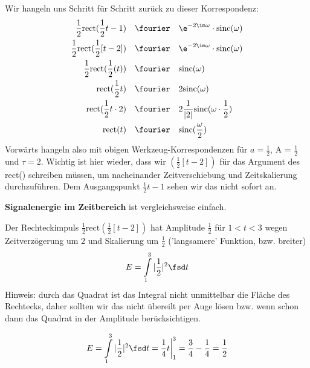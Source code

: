 \begin{ExCalc}
Wir hangeln uns Schritt für Schritt zurück zu dieser Korrespondenz:
\begin{align}
\frac{1}{2} \mathrm{rect}(\frac{1}{2}t - 1) &\quad\fourier\quad \e^{-2 \im \omega} \cdot \mathrm{sinc}(\omega)\\
\frac{1}{2} \mathrm{rect}(\frac{1}{2} [t - 2]) &\quad\fourier\quad \e^{-2 \im \omega} \cdot \mathrm{sinc}(\omega)\\
\frac{1}{2} \mathrm{rect}(\frac{1}{2} (t)) &\quad\fourier\quad \mathrm{sinc}(\omega)\\
\mathrm{rect}(\frac{1}{2} t) &\quad\fourier\quad 2 \mathrm{sinc}(\omega)\\
\mathrm{rect}(\frac{1}{2} t \cdot 2) &\quad\fourier\quad 2 \frac{1}{|2|} \mathrm{sinc}(\omega \cdot \frac{1}{2})\\
\mathrm{rect}(t) &\quad\fourier\quad \mathrm{sinc}(\frac{\omega}{2})
\end{align}
Vorwärts hangeln also mit obigen Werkzeug-Korrespondenzen für $a=\frac{1}{2}$, A = $\frac{1}{2}$ und $\tau=2$.
Wichtig ist hier wieder, dass wir $(\frac{1}{2} [t - 2])$ für das Argument des rect()
schreiben müssen, um nacheinander
Zeitverschiebung und Zeitskalierung durchzuführen. Dem Ausgangspunkt $\frac{1}{2}t - 1$
sehen wir das nicht sofort an.
\end{ExCalc}

\begin{Ansatz}
\textbf{Signalenergie im Zeitbereich} ist vergleichsweise einfach.

Der Rechteckimpuls $\frac{1}{2} \mathrm{rect}(\frac{1}{2} [t - 2])$ hat Amplitude
$\frac{1}{2}$ für $1 < t < 3$ wegen Zeitverzögerung um $2$ und Skalierung um $\frac{1}{2}$
('langsamere' Funktion, bzw. breiter)
%
\begin{equation}
  E = \int\limits_{1}^{3} |\frac{1}{2}|^2 \fsd t
\end{equation}
%
Hinweis: durch das Quadrat ist das Integral nicht unmittelbar die Fläche
des Rechtecks, daher sollten wir das nicht übereilt per Auge lösen bzw.
wenn schon dann das Quadrat in der Amplitude berücksichtigen.
\end{Ansatz}

\begin{ExCalc}
\begin{equation}
  E = \int\limits_{1}^{3} |\frac{1}{2}|^2 \fsd t = \frac{1}{4} t\bigg|_{1}^{3} =
  \frac{3}{4} - \frac{1}{4} = \frac{1}{2}
\end{equation}
\end{ExCalc}


